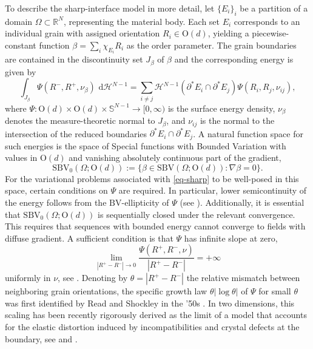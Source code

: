 \documentclass[a4paper,reqno]{amsart}
\newcommand\R{\mathbb{R}}
\newcommand{\BV}{\mathrm{BV}}
\newcommand{\SBV}{\mathrm{SBV}}
\newcommand\di{{\,\mathrm{d}}}
\theoremstyle{remark}
\newcommand{\On}{\mathrm{O}(d)}
\newcommand{\PC}{\mathrm{SBV}_0}
\newcommand{\SN}{\mathbb{S}^{N-1}}
\numberwithin{equation}{section}
\begin{document}
To describe the sharp-interface model in more detail, let  $\{E_i\}_i$ be
a partition
of a domain $\Omega\subset\R^N$, representing the material body.
Each set $E_i$
corresponds to an individual grain with assigned orientation $R_i\in\On$,
yielding a piecewise-constant function $\beta=\sum_i\chi_{E_i}R_i$  as the order parameter.
The grain boundaries  are contained in the discontinuity set $J_\beta$ of
 $\beta$ and the corresponding energy is given by
\begin{equation}\label{eq-sharp}
	\int_{J_\beta} \Psi(R^-, R^+,\nu_\beta)\,  \di  \mathcal{H}^{N-1}= \sum_{i\neq j} \mathcal{H}^{N-1}(\partial^* E_i\cap\partial^* E_j)\Psi (R_i,R_j,\nu_{ij}),
\end{equation}
where $\Psi:\On\times\On\times \SN  \to[0,\infty)$ is the surface energy density, $\nu_\beta$ denotes
the measure-theoretic normal to $J_\beta$, and
$\nu_{ij}$ is the normal to the intersection of the reduced boundaries
$\partial^* E_i\cap\partial^* E_j$.
A natural function space for such
energies is the space of  Special functions with Bounded Variation with values in $\On$
and vanishing absolutely continuous part of the gradient,
 \begin{equation}\label{def:SBV0}
	\PC(\Omega; \On):=\{\beta \in \SBV(\Omega; \On)\colon \nabla \beta=0\}.
\end{equation}
For the variational problems associated with \eqref{eq-sharp}  to be  well-posed in this space, certain conditions on $\Psi$ are required. In particular,
lower semicontinuity of the energy follows from
the $\BV$-ellipticity of $\Psi$ (see \cite[Theorem~5.14]{AmbFusPal00}). Additionally, it is essential that $\PC(\Omega; \On)$
is sequentially closed under the relevant convergence. This requires that sequences with bounded energy cannot converge to fields with diffuse gradient. A sufficient condition is that
$\Psi$ has infinite slope at zero,
$$
\lim_{|R^+- R^-|\to 0}\frac{\Psi(R^+, R^-,\nu)}{|R^+- R^-|}= +\infty
$$
uniformly in $\nu$,
see
\cite[Theorem~4.7]{AmbFusPal00}.
 Denoting by $\theta=|R^+- R^-|$ the relative mismatch between neighboring grain orientations, the specific growth law $\theta |\log\theta|$ of $\Psi$ for small $\theta$ was first identified
 by Read and Shockley
  in the '50s \cite{RS}.
In two dimensions, this scaling has been recently rigorously derived  as the limit of a model that accounts for the elastic distortion induced by incompatibilities and crystal defects at the boundary, see \cite{LauLuc,ForGarSpa24} and
\cite{fanzon2019derivation}.
\end{document}
